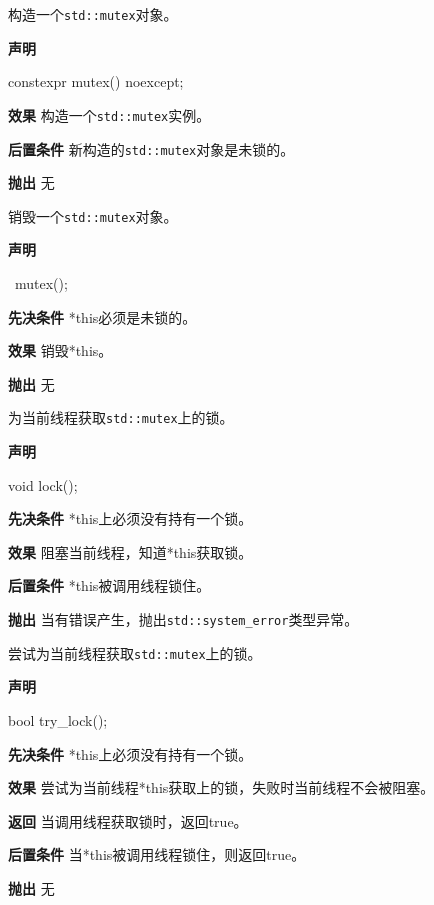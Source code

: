 构造一个\texttt{std::mutex}对象。

\textbf{声明}

\begin{cpp}
constexpr mutex() noexcept;
\end{cpp}

\textbf{效果}
构造一个\texttt{std::mutex}实例。

\textbf{后置条件}
新构造的\texttt{std::mutex}对象是未锁的。

\textbf{抛出}
无


销毁一个\texttt{std::mutex}对象。

\textbf{声明}

\begin{cpp}
~mutex();
\end{cpp}

\textbf{先决条件}
*this必须是未锁的。

\textbf{效果}
销毁*this。

\textbf{抛出}
无


为当前线程获取\texttt{std::mutex}上的锁。

\textbf{声明}

\begin{cpp}
void lock();
\end{cpp}

\textbf{先决条件}
*this上必须没有持有一个锁。

\textbf{效果}
阻塞当前线程，知道*this获取锁。

\textbf{后置条件}
*this被调用线程锁住。

\textbf{抛出}
当有错误产生，抛出\texttt{std::system\_error}类型异常。


尝试为当前线程获取\texttt{std::mutex}上的锁。

\textbf{声明}

\begin{cpp}
bool try_lock();
\end{cpp}

\textbf{先决条件}
*this上必须没有持有一个锁。

\textbf{效果}
尝试为当前线程*this获取上的锁，失败时当前线程不会被阻塞。

\textbf{返回}
当调用线程获取锁时，返回true。

\textbf{后置条件}
当*this被调用线程锁住，则返回true。

\textbf{抛出}
无

